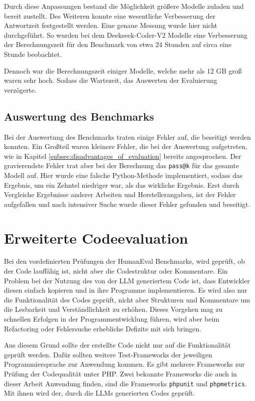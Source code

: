 Durch diese Anpassungen bestand die Möglichkeit größere Modelle zuladen und bereit zustellt. Des Weiteren konnte eine wesentliche Verbesserung der Antwortzeit festgestellt werden. Eine genaue Messung wurde hier nicht durchgeführt. So wurden bei dem Deekseek-Coder-V2 Modelle eine Verbesserung der Berechnungszeit für den Benchmark von etwa 24 Stunden auf circa eine Stunde beobachtet.\vspace{0.2cm}

Dennoch war die Berechnungszeit einiger Modelle, welche mehr als 12 GB groß waren sehr hoch. Sodass die Wartezeit, das Auswerten der Evaluierung verzögerte.


\subsection{Auswertung des Benchmarks}
Bei der Auswertung des Benchmarks traten einige Fehler auf, die beseitigt werden konnten. Ein Großteil waren kleinere Fehler, die bei der Auswertung aufgetreten, wie in Kapitel \ref{subsec:disadvantages_of_evaluation} bereits angesprochen. Der gravierendste Fehler trat aber bei der Berechnung das \texttt{pass@k} für das gesamte Modell auf. Hier wurde eine falsche Python-Methode implementiert, sodass das Ergebnis, um ein Zehntel niedriger war, als das wirkliche Ergebnis. Erst durch Vergleiche Ergebnisse anderer Arbeiten und Herstellerangaben, ist der Fehler aufgefallen und nach intensiver Suche wurde dieser Fehler gefunden und beseitigt.



\section{Erweiterte Codeevaluation}
Bei den vordefinierten Prüfungen der HumanEval Benchmarks, wird geprüft, ob der Code lauffähig ist, nicht aber die Codestruktur oder Kommentare. Ein Problem bei der Nutzung des von der LLM generiertem Code ist, dass Entwickler diesen einfach kopieren und in ihre Programme implementieren. Es wird also nur die Funktionalität des Codes geprüft, nicht aber Strukturen und Kommentare um die Lesbarkeit und Verständlichkeit zu erhöhen. Dieses Vorgehen mag zu schnellen Erfolgen in der Programmentwicklung führen, wird aber beim Refactoring oder Fehlersuche erhebliche Defizite mit sich bringen.\vspace{0.2cm}

Aus diesem Grund sollte der erstellte Code nicht nur auf die Funktionalität geprüft werden. Dafür sollten weitere Test-Frameworks der jeweiligen Programmiersprache zur Anwendung kommen. Es gibt mehrere Frameworks zur Prüfung der Codequalität unter PHP. Zwei bekannte Frameworks die auch in dieser Arbeit Anwendung finden, sind die Frameworks \texttt{phpunit} und \texttt{phpmetrics}. Mit ihnen wird der, durch die LLMs generierten Codes geprüft.\vspace{0.2cm}

